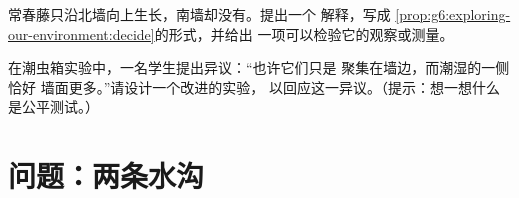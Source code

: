 \begin{exercise}[$\star\star$]\label{exo:g6:exploring-our-environment:11}
常春藤只沿北墙向上生长，南墙却没有。提出一个
解释，写成
\cref{prop:g6:exploring-our-environment:decide}的形式，并给出
一项可以检验它的观察或测量。
\end{exercise}

\begin{exercise}[$\star\star\star$]\label{exo:g6:exploring-our-environment:12}
在潮虫箱实验中，一名学生提出异议：“也许它们只是
聚集在墙边，而潮湿的一侧恰好
墙面更多。”请设计一个改进的实验，
以回应这一异议。（提示：想一想什么是公平测试。）
\end{exercise}

\section{问题：两条水沟}

